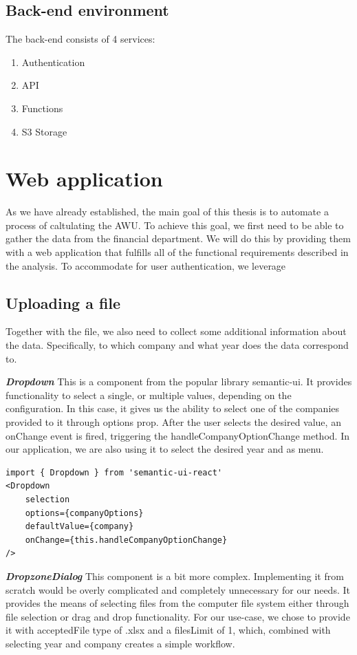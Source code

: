 \documentclass[12pt,oneside]{fithesis2}
\begin{document}
\subsection{Back-end environment}
The back-end consists of 4 services:
\begin{enumerate}
    \setlength\itemsep{0em}
    \item Authentication
    \item API
    \item Functions
    \item S3 Storage
\end{enumerate}
\section{Web application}
As we have already established, the main goal of this thesis is to automate a process of caltulating the AWU. To achieve this goal, we first need to be able to gather the data from the financial department. We will do this by providing them with a web application that fulfills all of the functional requirements described in the analysis.
To accommodate for user authentication, we leverage 

\subsection{Uploading a file}
Together with the file, we also need to collect some additional information about the data. Specifically, to which company and what year does the data correspond to.

\textit{\textbf{Dropdown}} This is a component from the popular library semantic-ui. It provides functionality to select a single, or multiple values, depending on the configuration. In this case, it gives us the ability to select one of the companies provided to it through options prop. After the user selects the desired value, an onChange event is fired, triggering the handleCompanyOptionChange method. In our application, we are also using it to select the desired year and as menu.

\begin{lstlisting}[style=htmlcssjs]
import { Dropdown } from 'semantic-ui-react'
<Dropdown
    selection
    options={companyOptions}
    defaultValue={company}
    onChange={this.handleCompanyOptionChange}
/>
\end{lstlisting}

\textit{\textbf{DropzoneDialog}} This component is a bit more complex. Implementing it from scratch would be overly complicated and completely unnecessary for our needs. It provides the means of selecting files from the computer file system either through file selection or drag and drop functionality. For our use-case, we chose to provide it with acceptedFile type of .xlsx and a filesLimit of 1, which, combined with selecting year and company creates a simple workflow.
\end{document}
